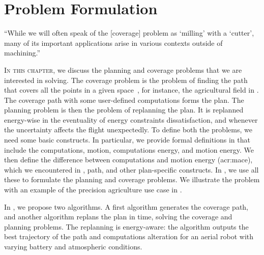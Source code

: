
%
%
%
%
\chapter{Problem Formulation}
\label{cp:pb}

\begin{chapquote}{\cite{arkin2001optimal}}
  ``While we will often speak of the [coverage] problem as `milling' with a `cutter', many of its important applications arise in various contexts outside of machining.''
\end{chapquote}

\vspace*{1em}

\lettrine{I}{n this chapter}, we discuss the planning and coverage problems that we are interested in solving. The coverage problem is the problem of finding the path that covers all the points in a given space~\citep{choset2001coverage,galceran2013survey}, for instance, the agricultural field in . The coverage path with some user-defined computations forms the plan. The planning problem is then the problem of replanning the plan. It is replanned energy-wise in the eventuality of energy constraints dissatisfaction, and whenever the uncertainty affects the flight unexpectedly. To define both the problems, we need some basic constructs. In particular, we provide formal definitions in  that include the computations, motion, computations energy, and motion energy. We then define the difference between computations and motion energy (\Gls{acr:mace}), which we encountered in , path, and other plan-specific constructs. In , we use all these to formulate the planning and coverage problems. We illustrate the problem with an example of the precision agriculture use case in .

In , we propose two algorithms. A first algorithm generates the coverage path, and another algorithm replans the plan in time, solving the coverage and planning problems. The replanning is energy-aware: the algorithm outputs the best trajectory of the path and computations alteration for an aerial robot with varying battery and atmospheric conditions. 


